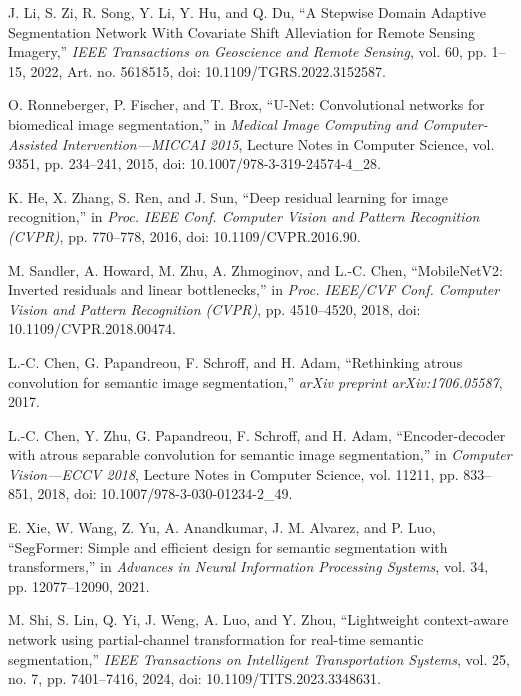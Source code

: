 J. Li, S. Zi, R. Song, Y. Li, Y. Hu, and Q. Du,
``A Stepwise Domain Adaptive Segmentation Network With Covariate
Shift Alleviation for Remote Sensing Imagery,''
\emph{IEEE Transactions on Geoscience and Remote Sensing},
vol. 60, pp. 1--15, 2022, Art. no. 5618515,
doi: 10.1109/TGRS.2022.3152587.

O. Ronneberger, P. Fischer, and T. Brox,
``U-Net: Convolutional networks for biomedical image segmentation,''
in \emph{Medical Image Computing and Computer-Assisted Intervention---MICCAI 2015},
Lecture Notes in Computer Science, vol. 9351, pp. 234--241, 2015,
doi: 10.1007/978-3-319-24574-4\_28.

K. He, X. Zhang, S. Ren, and J. Sun,
``Deep residual learning for image recognition,''
in \emph{Proc. IEEE Conf. Computer Vision and Pattern Recognition (CVPR)},
pp. 770--778, 2016,
doi: 10.1109/CVPR.2016.90.

M. Sandler, A. Howard, M. Zhu, A. Zhmoginov, and L.-C. Chen,
``MobileNetV2: Inverted residuals and linear bottlenecks,''
in \emph{Proc. IEEE/CVF Conf. Computer Vision and Pattern Recognition (CVPR)},
pp. 4510--4520, 2018,
doi: 10.1109/CVPR.2018.00474.

L.-C. Chen, G. Papandreou, F. Schroff, and H. Adam,
``Rethinking atrous convolution for semantic image segmentation,''
\emph{arXiv preprint arXiv:1706.05587}, 2017.

L.-C. Chen, Y. Zhu, G. Papandreou, F. Schroff, and H. Adam,
``Encoder-decoder with atrous separable convolution for semantic image segmentation,''
in \emph{Computer Vision---ECCV 2018},
Lecture Notes in Computer Science, vol. 11211,
pp. 833--851, 2018,
doi: 10.1007/978-3-030-01234-2\_49.

E. Xie, W. Wang, Z. Yu, A. Anandkumar, J. M. Alvarez, and P. Luo,
``SegFormer: Simple and efficient design for semantic segmentation with transformers,''
in \emph{Advances in Neural Information Processing Systems},
vol. 34, pp. 12077--12090, 2021.

M. Shi, S. Lin, Q. Yi, J. Weng, A. Luo, and Y. Zhou,
``Lightweight context-aware network using partial-channel transformation
for real-time semantic segmentation,''
\emph{IEEE Transactions on Intelligent Transportation Systems},
vol. 25, no. 7, pp. 7401--7416, 2024,
doi: 10.1109/TITS.2023.3348631.


